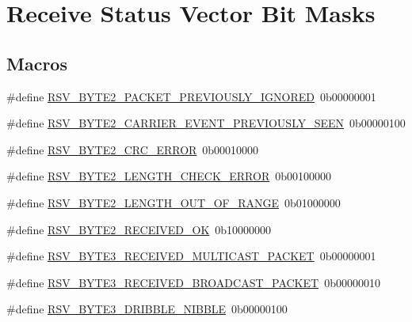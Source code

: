 \hypertarget{group__rsv_bits}{}\section{Receive Status Vector Bit Masks}
\label{group__rsv_bits}
\subsection*{Macros}
\begin{DoxyCompactItemize}
\item 
\#define \mbox{\hyperlink{group__rsv_bits_gabb7a7f4cdbc591010a1e6fd94c444734}{R\+S\+V\+\_\+\+B\+Y\+T\+E2\+\_\+\+P\+A\+C\+K\+E\+T\+\_\+\+P\+R\+E\+V\+I\+O\+U\+S\+L\+Y\+\_\+\+I\+G\+N\+O\+R\+ED}}~0b00000001
\item 
\#define \mbox{\hyperlink{group__rsv_bits_gafcc8915d0220c1ed83eb1147ce4e9e09}{R\+S\+V\+\_\+\+B\+Y\+T\+E2\+\_\+\+C\+A\+R\+R\+I\+E\+R\+\_\+\+E\+V\+E\+N\+T\+\_\+\+P\+R\+E\+V\+I\+O\+U\+S\+L\+Y\+\_\+\+S\+E\+EN}}~0b00000100
\item 
\#define \mbox{\hyperlink{group__rsv_bits_gace08d6adf3cc71efe58de192f32e7eed}{R\+S\+V\+\_\+\+B\+Y\+T\+E2\+\_\+\+C\+R\+C\+\_\+\+E\+R\+R\+OR}}~0b00010000
\item 
\#define \mbox{\hyperlink{group__rsv_bits_ga6357e8c0947cbeac9db63de2eccb0ec7}{R\+S\+V\+\_\+\+B\+Y\+T\+E2\+\_\+\+L\+E\+N\+G\+T\+H\+\_\+\+C\+H\+E\+C\+K\+\_\+\+E\+R\+R\+OR}}~0b00100000
\item 
\#define \mbox{\hyperlink{group__rsv_bits_ga304b3ff7e33f76cb6266a42edc52c013}{R\+S\+V\+\_\+\+B\+Y\+T\+E2\+\_\+\+L\+E\+N\+G\+T\+H\+\_\+\+O\+U\+T\+\_\+\+O\+F\+\_\+\+R\+A\+N\+GE}}~0b01000000
\item 
\#define \mbox{\hyperlink{group__rsv_bits_gae48d0c27661f4863ec21153ceb5ad8b2}{R\+S\+V\+\_\+\+B\+Y\+T\+E2\+\_\+\+R\+E\+C\+E\+I\+V\+E\+D\+\_\+\+OK}}~0b10000000
\item 
\#define \mbox{\hyperlink{group__rsv_bits_ga8cd28365aea08543683d6477796fad4d}{R\+S\+V\+\_\+\+B\+Y\+T\+E3\+\_\+\+R\+E\+C\+E\+I\+V\+E\+D\+\_\+\+M\+U\+L\+T\+I\+C\+A\+S\+T\+\_\+\+P\+A\+C\+K\+ET}}~0b00000001
\item 
\#define \mbox{\hyperlink{group__rsv_bits_ga06f2e1468cb53ccaabf5f13d19881f77}{R\+S\+V\+\_\+\+B\+Y\+T\+E3\+\_\+\+R\+E\+C\+E\+I\+V\+E\+D\+\_\+\+B\+R\+O\+A\+D\+C\+A\+S\+T\+\_\+\+P\+A\+C\+K\+ET}}~0b00000010
\item 
\#define \mbox{\hyperlink{group__rsv_bits_ga97efdc2e71e9580117ca7b7b38218224}{R\+S\+V\+\_\+\+B\+Y\+T\+E3\+\_\+\+D\+R\+I\+B\+B\+L\+E\+\_\+\+N\+I\+B\+B\+LE}}~0b00000100

\end{DoxyCompactItemize}
